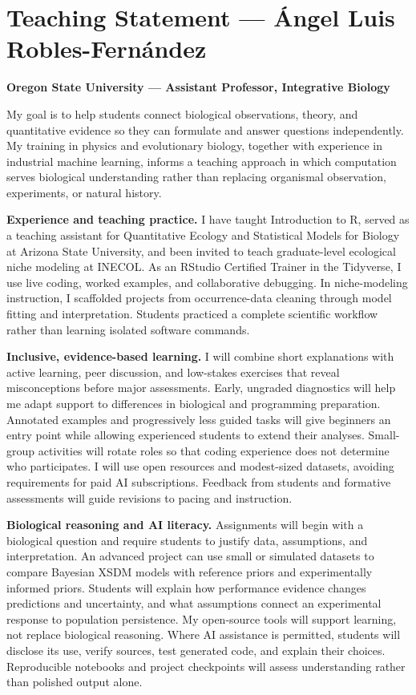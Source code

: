 \documentclass[11pt,letterpaper]{article}
\begin{document}
\section*{Teaching Statement --- \'{A}ngel Luis Robles-Fern\'andez}
\textbf{Oregon State University --- Assistant Professor, Integrative Biology}

My goal is to help students connect biological observations, theory, and quantitative evidence so they can formulate and answer questions independently. My training in physics and evolutionary biology, together with experience in industrial machine learning, informs a teaching approach in which computation serves biological understanding rather than replacing organismal observation, experiments, or natural history.

\textbf{Experience and teaching practice.}
I have taught Introduction to R, served as a teaching assistant for Quantitative Ecology and Statistical Models for Biology at Arizona State University, and been invited to teach graduate-level ecological niche modeling at INECOL. As an RStudio Certified Trainer in the Tidyverse, I use live coding, worked examples, and collaborative debugging. In niche-modeling instruction, I scaffolded projects from occurrence-data cleaning through model fitting and interpretation. Students practiced a complete scientific workflow rather than learning isolated software commands.

\textbf{Inclusive, evidence-based learning.}
I will combine short explanations with active learning, peer discussion, and low-stakes exercises that reveal misconceptions before major assessments. Early, ungraded diagnostics will help me adapt support to differences in biological and programming preparation. Annotated examples and progressively less guided tasks will give beginners an entry point while allowing experienced students to extend their analyses. Small-group activities will rotate roles so that coding experience does not determine who participates. I will use open resources and modest-sized datasets, avoiding requirements for paid AI subscriptions. Feedback from students and formative assessments will guide revisions to pacing and instruction.

\textbf{Biological reasoning and AI literacy.}
Assignments will begin with a biological question and require students to justify data, assumptions, and interpretation. An advanced project can use small or simulated datasets to compare Bayesian XSDM models with reference priors and experimentally informed priors. Students will explain how performance evidence changes predictions and uncertainty, and what assumptions connect an experimental response to population persistence. My open-source tools will support learning, not replace biological reasoning. Where AI assistance is permitted, students will disclose its use, verify sources, test generated code, and explain their choices. Reproducible notebooks and project checkpoints will assess understanding rather than polished output alone.
\end{document}
